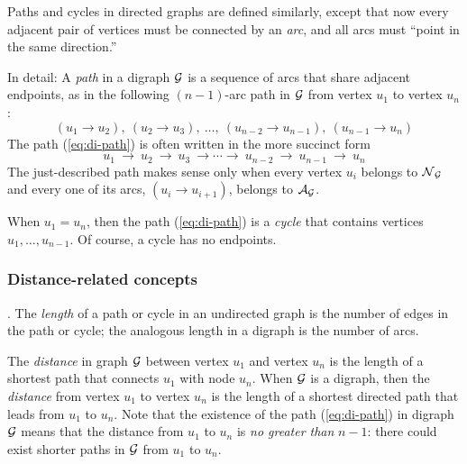 \medskip

 

Paths and cycles in directed graphs are defined similarly, except that now every adjacent pair of vertices must be connected by an {\em arc}, and all arcs must ``point in the same direction.''

In detail: A {\it path} in a digraph $\mbox{$\cal G$}$ is a sequence of arcs that share adjacent endpoints, as in the following $(n-1)$-arc path in $\mbox{$\cal G$}$ from vertex $u_1$ to vertex $u_n$:
\begin{equation}
\label{eq:di-path}
(u_1 \rightarrow u_2), \ (u_2 \rightarrow u_3), \ \ldots, \ (u_{n-2} \rightarrow u_{n-1}), \ (u_{n-1} \rightarrow u_n)
\end{equation}
The path (\ref{eq:di-path}) is often written in the more succinct form
\[
u_1 \ \rightarrow \ u_2 \ \rightarrow \ u_3 \ \rightarrow \cdots \rightarrow \ u_{n-2} \ \rightarrow \ u_{n-1} \ \rightarrow \ u_n
\]
The just-described path makes sense only when every vertex $u_i$ belongs to $\mbox{$\cal N$}_{\mbox{{\scriptsize $\cal G$}}}$ and every one of its arcs, $(u_i \rightarrow u_{i+1})$, belongs to $\mbox{$\cal A$}_{\mbox{{\scriptsize $\cal G$}}}$.


When $u_1 = u_n$, then the path (\ref{eq:di-path}) is a {\em cycle} that contains vertices $u_1, \ldots, u_{n-1}$.  Of course, a cycle has no endpoints.

\medskip

  
  

\subsubsection{Distance-related concepts}

.
The {\it length} of a path or cycle in an undirected graph is the number of edges in the path or cycle; the analogous length in a digraph is the number of arcs.

\smallskip

The  {\it distance} in graph $\mbox{$\cal G$}$ between vertex $u_1$ and vertex $u_n$ is the length of a shortest path that connects $u_1$ with node $u_n$.  When $\mbox{$\cal G$}$ is a digraph, then the {\it distance} from vertex $u_1$ to vertex $u_n$ is the length of a shortest directed path that leads from $u_1$ to $u_n$.  Note that the existence of the path (\ref{eq:di-path}) in digraph $\mbox{$\cal G$}$ means that the distance from $u_1$ to $u_n$ is {\em no greater than} $n-1$: there could exist shorter paths in $\mbox{$\cal G$}$ from $u_1$ to $u_n$.


